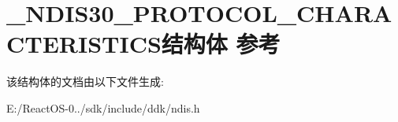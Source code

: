 \hypertarget{struct___n_d_i_s30___p_r_o_t_o_c_o_l___c_h_a_r_a_c_t_e_r_i_s_t_i_c_s}{}\section{\+\_\+\+N\+D\+I\+S30\+\_\+\+P\+R\+O\+T\+O\+C\+O\+L\+\_\+\+C\+H\+A\+R\+A\+C\+T\+E\+R\+I\+S\+T\+I\+C\+S结构体 参考}
\label{struct___n_d_i_s30___p_r_o_t_o_c_o_l___c_h_a_r_a_c_t_e_r_i_s_t_i_c_s}


该结构体的文档由以下文件生成\+:\begin{DoxyCompactItemize}
\item 
E\+:/\+React\+O\+S-\/0../sdk/include/ddk/ndis.\+h\end{DoxyCompactItemize}
